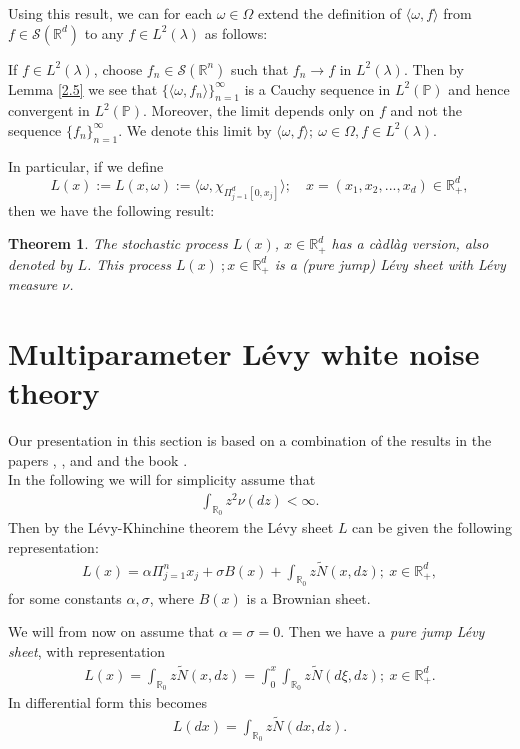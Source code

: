 \documentclass[12pt]{article}%
\newtheorem{theorem}{Theorem}[section]
\numberwithin{equation}{section}
\def\P{\mathbb{P}}
\def\R{\mathbb{R}}
\begin{document}
Using this result, we can for each  $\omega \in \Omega$ extend the definition of $\langle \omega,f\rangle$ from $f\in\mathcal{S}(\R^d)$ to any $f\in L^2(\lambda)$ as follows:

If $f\in L^2(\lambda)$, choose $f_n\in\mathcal{S}(\R^n)$ such that $f_n\rightarrow f$ in $L^2(\lambda)$. 
Then by Lemma \ref{2.5} we see that $\{\langle
\omega,f_n\rangle\}_{n=1}^\infty$ is a Cauchy sequence in $L^2(\P)$ and hence convergent in $L^2(\P)$. 
Moreover, the limit depends only on
$f$ and not the sequence $\{f_n\}_{n=1}^\infty$. 
We denote this limit by $\langle \omega,f\rangle; \  \omega \in \Omega, f \in L^2(\lambda).$

In particular, if we define
$$L(x):=L(x,\omega):=\langle\omega,\chi_
{\Pi_{j=1}^d [0,x_j]} \rangle;\quad x=(x_1, x_2, ... ,x_d) \in \R_+^d,$$
then we have the following result:

\begin{theorem}
The stochastic process $L(x)$, $x \in \R_+^d$ has a c\`{a}dl\`{a}g version, also denoted by $L$. 
This process $L(x)\ ; x\in \R_+^d$ is a (pure jump) L\'{e}vy
sheet with L\'{e}vy measure $\nu$.
\end{theorem}


\section{Multiparameter L\' evy white noise theory}
Our presentation in this section is based on a combination of the results in the papers \cite{IR}, \cite{DW}, \cite{DOP} and \cite{OP} and the book \cite{HOUZ}.\\

In the following we will for simplicity assume that
\begin{align}
\int_{\R_0} z^2 \nu(dz) < \infty.
\end{align}
Then by the L\'{e}vy-Khinchine theorem the L\'{e}vy sheet $L$ can be given the following representation:
\begin{align}
    L(x)=\alpha \Pi_{j=1}^n x_j + \sigma B(x) + \int_{\R_0} z \widetilde{N}(x, dz); \ x \in \R_+^d,
\end{align}
for some constants $\alpha, \sigma$, where $B(x)$ is a Brownian sheet.

We will from now on assume that $\alpha=\sigma=0$. 
Then we have a \emph{pure jump L\'evy sheet}, with representation
\begin{align} 
L(x)=\int_{\R_0} z \widetilde{N}(x,dz)=\int_0^x \int_{\R_0} z \widetilde{N}(d\xi,dz); \ x \in \R_+^d. \label{LN}
\end{align}
In differential form this becomes
\begin{align}\label{ldx}
    L(dx)= \int_{\R_0} z \widetilde{N}(dx,dz).
\end{align}
\end{document}
